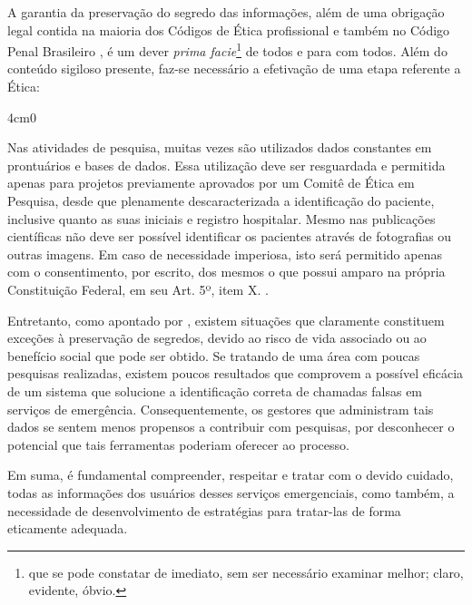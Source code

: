 A garantia da preservação do segredo das informações, além de uma obrigação legal contida na maioria dos Códigos de Ética profissional e também no Código Penal Brasileiro \citep{cp340}, é um dever \textit{prima facie}\footnote{que se pode constatar de imediato, sem ser necessário examinar melhor; claro, evidente, óbvio.} de todos e para com todos. Além do conteúdo sigiloso presente, faz-se necessário a efetivação de uma etapa referente a Ética:

\renewenvironment{quote}[1][1em]
  {\begin{adjustwidth}{#1}{0}}
  {\end{adjustwidth}}
\begin{quote}[4cm]
\begin{singlespace}
{\footnotesize  
Nas atividades de pesquisa, muitas vezes são utilizados dados constantes em prontuários e bases de dados. Essa utilização deve ser resguardada e permitida apenas para projetos previamente aprovados por um Comitê de Ética em Pesquisa, desde que plenamente descaracterizada a identificação do paciente, inclusive quanto as suas iniciais e registro hospitalar. Mesmo nas publicações científicas não deve ser possível identificar os pacientes através de fotografias ou outras imagens. Em caso de necessidade imperiosa, isto será permitido apenas com o consentimento, por escrito, dos mesmos o que possui amparo na própria Constituição Federal, em seu Art. 5º, item X. \citep{francisconi1998aspectos}.
}
\end{singlespace}
\end{quote}

Entretanto, como apontado por \cite{francisconi1998aspectos}, existem situações que claramente constituem exceções à preservação de segredos, devido ao risco de vida associado ou ao benefício social que pode ser obtido. Se tratando de uma área com poucas pesquisas realizadas, existem poucos resultados que comprovem a possível eficácia de um sistema que solucione a identificação correta de chamadas falsas em serviços de emergência. Consequentemente, os gestores que administram tais dados se sentem menos propensos a contribuir com pesquisas, por desconhecer o potencial que tais ferramentas poderiam oferecer ao processo.

Em suma, é fundamental compreender, respeitar e tratar com o devido cuidado, todas as informações dos usuários desses serviços emergenciais, como também, a necessidade de desenvolvimento de estratégias para tratar-las de forma eticamente adequada.